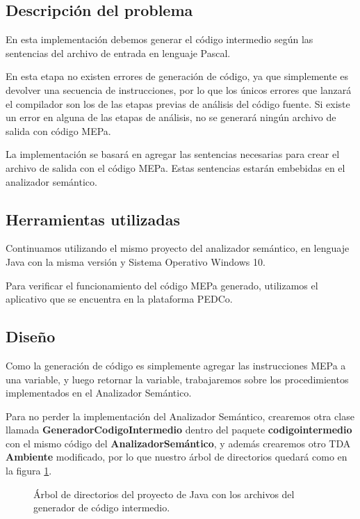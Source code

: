 \subsection{Descripción del problema}
En esta implementación debemos generar el código intermedio según las sentencias del archivo de entrada en lenguaje Pascal. 

En esta etapa no existen errores de generación de código, ya que simplemente es devolver una secuencia de instrucciones, por lo que los únicos errores que lanzará el compilador son los de las etapas previas de análisis del código fuente. Si existe un error en alguna de las etapas de análisis, no se generará ningún archivo de salida con código MEPa.

La implementación se basará en agregar las sentencias necesarias para crear el archivo de salida con el código MEPa. Estas sentencias estarán embebidas en el analizador semántico.

\subsection{Herramientas utilizadas}
Continuamos utilizando el mismo proyecto del analizador semántico, en lenguaje Java con la misma versión y Sistema Operativo Windows 10.

Para verificar el funcionamiento del código MEPa generado, utilizamos el aplicativo que se encuentra en la plataforma PEDCo.

\subsection{Diseño}
Como la generación de código es simplemente agregar las instrucciones MEPa a una variable, y luego retornar la variable, trabajaremos sobre los procedimientos implementados en el Analizador Semántico. 

Para no perder la implementación del Analizador Semántico, crearemos otra clase llamada \textbf{GeneradorCodigoIntermedio} dentro del paquete \textbf{codigointermedio} con el mismo código del \textbf{AnalizadorSemántico}, y además crearemos otro TDA \textbf{Ambiente} modificado, por lo que nuestro árbol de directorios quedará como en la figura \ref{fig:arbol_dir_5}.

\begin{figure}[H]
\caption{Árbol de directorios del proyecto de Java con los archivos del generador de código intermedio.}
\label{fig:arbol_dir_5}
\end{figure}


